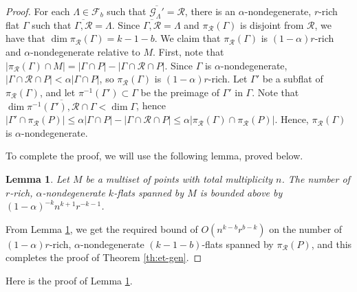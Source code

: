 \documentclass{article}
\newtheorem{lemma}[theorem]{Lemma}
\begin{document}
\begin{proof}
	For each $\Lambda \in \mathcal{F}_b$ such that $\overline{\mathcal{G}_\Lambda'} = \mathcal{R}$, there is an $\alpha$-nondegenerate, $r$-rich flat $\Gamma$ such that $\overline{\Gamma, \mathcal{R}} = \Lambda$.
	Since $\overline{\Gamma,\mathcal{R}} = \Lambda$ and $\pi_{\mathcal{R}}(\Gamma)$ is disjoint from $\mathcal{R}$, we have that $\dim \pi_{\mathcal{R}}(\Gamma) = k-1-b$.
	We claim that $\pi_{\mathcal{R}}(\Gamma)$ is $(1-\alpha)r$-rich and $\alpha$-nondegenerate relative to $M$.
	First, note that $|\pi_\mathcal{R}(\Gamma) \cap M| = |\Gamma \cap P| - |\Gamma \cap \mathcal{R} \cap P|$.
	Since $\Gamma$ is $\alpha$-nondegenerate, $|\Gamma \cap \mathcal{R} \cap P| < \alpha |\Gamma \cap P|$, so $\pi_{\mathcal{R}}(\Gamma)$ is $(1-\alpha)r$-rich.
	Let $\Gamma'$ be a subflat of $\pi_{\mathcal{R}}(\Gamma)$, and let $\pi^{-1}(\Gamma') \subset \Gamma$ be the preimage of $\Gamma'$ in $\Gamma$.
	Note that $\dim \overline{\pi^{-1}(\Gamma'), \mathcal{R} \cap \Gamma} < \dim \Gamma$, hence $|\Gamma' \cap \pi_\mathcal{R}(P)| \leq \alpha |\Gamma \cap P| - |\Gamma \cap \mathcal{R} \cap P| \leq \alpha|\pi_\mathcal{R}(\Gamma) \cap \pi_\mathcal{R}(P)|$.
	Hence, $\pi_\mathcal{R}(\Gamma)$ is $\alpha$-nondegenerate.
	
	To complete the proof, we will use the following lemma, proved below.
	
	\begin{lemma}\label{th:mult-bound}
		Let $M$ be a multiset of points with total multiplicity $n$.
		The number of $r$-rich, $\alpha$-nondegenerate $k$-flats spanned by $M$ is bounded above by $(1-\alpha)^{-k}n^{k+1}r^{-k-1}$.
	\end{lemma}
	
	From Lemma \ref{th:mult-bound}, we get the required bound of $O(n^{k-b}r^{b-k})$ on the number of $(1-\alpha)r$-rich, $\alpha$-nondegenerate $(k-1-b)$-flats spanned by $\pi_\mathcal{R}(P)$, and this completes the proof of Theorem \ref{th:et-gen}.
\end{proof}

Here is the proof of Lemma \ref{th:mult-bound}.
\end{document}
